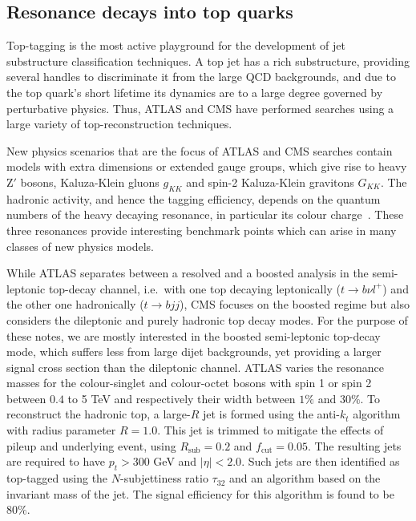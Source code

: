 \subsection{Resonance decays into top quarks}
Top-tagging is the most active playground for the development of jet substructure classification techniques. A top jet has a rich substructure, providing several handles to discriminate it from the large QCD backgrounds, and due to the top quark's short lifetime its dynamics are to a large degree governed by perturbative physics. Thus, ATLAS and CMS have performed searches using a large variety of top-reconstruction techniques. 

New physics scenarios that are the focus of ATLAS and CMS searches contain models with extra dimensions or extended gauge groups, which give rise to heavy $\text{Z}'$ bosons, Kaluza-Klein gluons $g_{KK}$ and spin-2 Kaluza-Klein gravitons $G_{KK}$. The hadronic activity, and hence the tagging efficiency, depends on the quantum numbers of the heavy decaying resonance, in particular its colour charge~\cite{Joshi:2012pu}. These three resonances provide interesting benchmark points which can arise in many classes of new physics models. 

While ATLAS \cite{Aaboud:2018mjh} separates between a resolved and a boosted analysis in the semi-leptonic top-decay channel, i.e.\ with one top decaying leptonically ($t\to b \nu l^+$) and the other one hadronically ($t \to b j j$), CMS \cite{Sirunyan:2018ryr} focuses on the boosted regime but also considers the dileptonic and purely hadronic top decay modes. For the purpose of these notes, we are mostly interested in the boosted semi-leptonic top-decay mode, which suffers less from large dijet backgrounds, yet providing a larger signal cross section than the dileptonic channel.
ATLAS varies the resonance masses for the colour-singlet and colour-octet bosons with spin 1 or spin 2 between $0.4$ to 5 TeV and respectively their width between $1\%$ and $30\%$. To reconstruct the hadronic top, a large-$R$ jet is formed using the anti-$k_t$ algorithm with radius parameter $R=1.0$. This jet is trimmed to mitigate the effects of pileup and underlying event, using $R_\mathrm{sub} = 0.2$ and $f_\mathrm{cut}=0.05$. The resulting jets are required to have $p_t> 300$ GeV and $|\eta| < 2.0$. Such jets are then identified as top-tagged using the $N$-subjettiness ratio $\tau_{32}$ and an algorithm based on the invariant mass of the jet. The signal efficiency for this algorithm is found to be $80\%$. 

